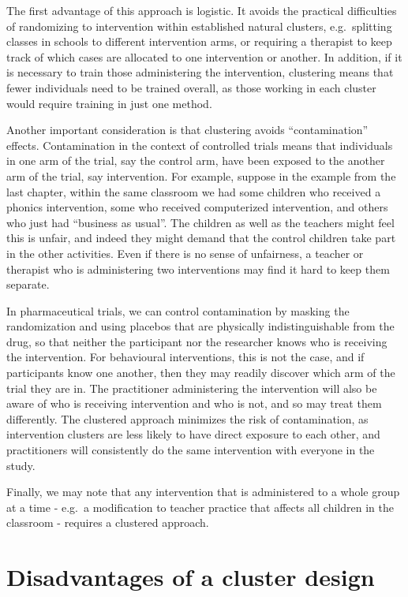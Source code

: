 \documentclass{krantz}
\begin{document}
The first advantage of this approach is logistic. It avoids the practical difficulties of randomizing to intervention within established natural clusters, e.g.~splitting classes in schools to different intervention arms, or requiring a therapist to keep track of which cases are allocated to one intervention or another. In addition, if it is necessary to train those administering the intervention, clustering means that fewer individuals need to be trained overall, as those working in each cluster would require training in just one method.

Another important consideration is that clustering avoids ``contamination'' effects. Contamination in the context of controlled trials means that individuals in one arm of the trial, say the control arm, have been exposed to the another arm of the trial, say intervention. For example, suppose in the example from the last chapter, within the same classroom we had some children who received a phonics intervention, some who received computerized intervention, and others who just had ``business as usual''. The children as well as the teachers might feel this is unfair, and indeed they might demand that the control children take part in the other activities. Even if there is no sense of unfairness, a teacher or therapist who is administering two interventions may find it hard to keep them separate.

In pharmaceutical trials, we can control contamination by masking the randomization and using placebos that are physically indistinguishable from the drug, so that neither the participant nor the researcher knows who is receiving the intervention. For behavioural interventions, this is not the case, and if participants know one another, then they may readily discover which arm of the trial they are in. The practitioner administering the intervention will also be aware of who is receiving intervention and who is not, and so may treat them differently. The clustered approach minimizes the risk of contamination, as intervention clusters are less likely to have direct exposure to each other, and practitioners will consistently do the same intervention with everyone in the study.

Finally, we may note that any intervention that is administered to a whole group at a time - e.g.~a modification to teacher practice that affects all children in the classroom - requires a clustered approach.

\hypertarget{disadvantages-of-a-cluster-design}{%
\section{Disadvantages of a cluster design}\label{disadvantages-of-a-cluster-design}}
\end{document}
